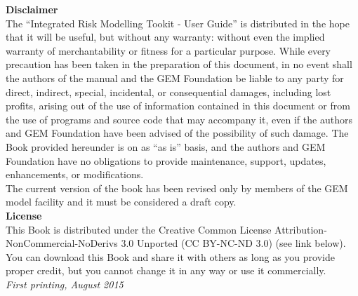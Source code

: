 \documentclass[11pt,fleqn]{book} %
\begin{document}
   {\bf{Disclaimer}} \hfill \\
\noindent
   The ``Integrated Risk Modelling Tookit - User Guide'' is distributed in the
   hope that it will be useful, but without any warranty: without even the
   implied warranty of merchantability or fitness for a particular purpose.
   While every precaution has been taken in the preparation of this document,
   in no event shall the authors of the manual and the GEM Foundation be liable
   to any party for direct, indirect, special, incidental, or consequential
   damages, including lost profits, arising out of the use of information
   contained in this document or from the use of programs and source code that
   may accompany it, even if the authors and GEM Foundation have been advised
   of the possibility of such damage.  The Book provided hereunder is on as ``as
   is'' basis, and the authors and GEM Foundation have no obligations to provide
   maintenance, support, updates, enhancements, or modifications. 
   \hfill \\
   The current version of the book has been revised only by members of 
   the GEM model facility and it must be considered a draft copy. 
   \vspace{0.4cm} \hfill \\
   {\bf{License}} \hfill \\
   This Book is distributed under the Creative Common License 
   Attribution-NonCommercial-NoDerivs 3.0 Unported (CC BY-NC-ND 3.0) 
   (see link below). You can download this Book and share it with 
   others as long as you provide proper credit, but you cannot change 
   it in any way or use it commercially. 
   \hfill \\

\noindent \textit{First printing, August 2015} %



\pagestyle{empty} %

\tableofcontents %

\cleardoublepage %

\pagestyle{fancy} %
\end{document}
